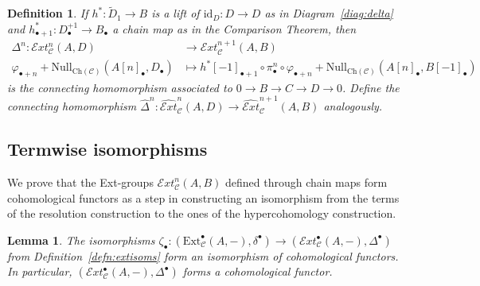 \documentclass[12pt,a4paper]{article}
\numberwithin{equation}{section}
\newtheorem{lem}[thm]{Lemma}
\newtheorem{defn}[thm]{Definition}
\theoremstyle{nonumberplain}
\begin{document}
\begin{defn}
If $h^{\ast}: \widetilde{D}_1 \rightarrow B$ is a lift of $\mathrm{id}_D: D \rightarrow D$ as in Diagram~\ref{diag:delta} and $h^{\ast}_{\bullet+1}: D_{\bullet}^{+1} \rightarrow B_{\bullet}$ a chain map as in the Comparison Theorem, then
\begin{align*}
\Delta^n: \mathcal{E}xt_{\mathcal{C}}^n(A, D) &\rightarrow \mathcal{E}xt_{\mathcal{C}}^{n+1}(A, B) \\
\varphi_{\bullet+n}+\mathrm{Null}_{\mathrm{Ch}(\mathcal{C})}(A[n]_{\bullet}, D_{\bullet}) &\mapsto h^{\ast}[-1]_{\bullet+1} \circ \pi_{\bullet}^n \circ \varphi_{\bullet+n}+\mathrm{Null}_{\mathrm{Ch}(\mathcal{C})}(A[n]_{\bullet}, B[-1]_{\bullet})
\end{align*}
is the connecting homomorphism associated to $0 \rightarrow B \rightarrow C \rightarrow D \rightarrow 0$. Define the connecting homomorphism $\widehat{\Delta}^n: \widehat{\mathcal{E}xt}_{\mathcal{C}}^n(A, D) \rightarrow \widehat{\mathcal{E}xt}_{\mathcal{C}}^{n+1}(A, B)$ analogously.
\end{defn}

\subsection{Termwise isomorphisms}

We prove that the Ext-groups $\mathcal{E}xt_{\mathcal{C}}^n(A, B)$ defined through chain maps form cohomological functors as a step in constructing an isomorphism from the terms of the resolution construction to the ones of the hypercohomology construction.

\begin{lem}\label{lem:ordinaryhypercohom}
The isomorphisms $\zeta_{\bullet}: (\mathrm{Ext}_{\mathcal{C}}^{\bullet}(A, -), \delta^{\bullet}) \rightarrow (\mathcal{E}xt_{\mathcal{C}}^{\bullet}(A, -), \Delta^{\bullet})$ from Definition~\ref{defn:extisoms} form an isomorphism of cohomological functors. In particular, $(\mathcal{E}xt_{\mathcal{C}}^{\bullet}(A, -), \Delta^{\bullet})$ forms a cohomological functor.
\end{lem}
\end{document}
